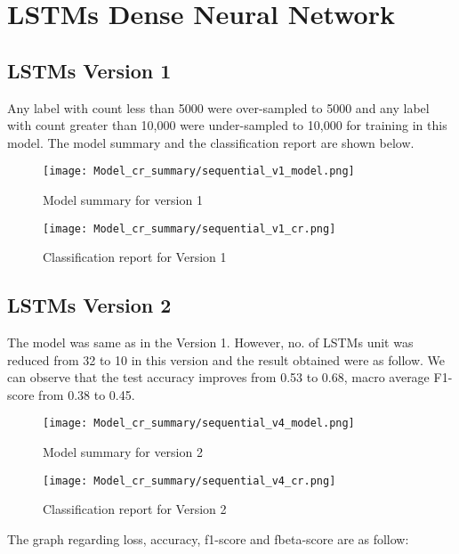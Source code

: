\section{LSTMs Dense Neural Network}

\subsection{LSTMs Version 1}
Any label with count less than 5000 were over-sampled to 5000 and any label with count greater than 10,000 were under-sampled to 10,000 for training in this model. The model summary and the classification report are shown below.

\begin{figure}[H]
    \centering
    \texttt{[image: Model\_cr\_summary/sequential\_v1\_model.png]}
    \caption{Model summary for version 1}
    \label{fig:Model summary for version 1}
\end{figure}

\begin{figure}[H]
    \centering
    \texttt{[image: Model\_cr\_summary/sequential\_v1\_cr.png]}
    \caption{Classification report for Version 1}
    \label{fig: Classification report for Version 1}
\end{figure}

\subsection{LSTMs Version 2}
The model was same as in the Version 1. However, no. of LSTMs unit was reduced from 32 to 10 in this version and the result obtained were as follow. We can observe that the test accuracy improves from 0.53 to 0.68, macro average F1-score from 0.38 to 0.45.

\begin{figure}[H]
    \centering
    \texttt{[image: Model\_cr\_summary/sequential\_v4\_model.png]}
    \caption{Model summary for version 2}
    \label{fig:Model summary for version 2}
\end{figure}

\begin{figure}[H]
    \centering
    \texttt{[image: Model\_cr\_summary/sequential\_v4\_cr.png]}
    \caption{Classification report for Version 2}
    \label{fig: Classification report for Version 2}
\end{figure}

The graph regarding loss, accuracy, f1-score and fbeta-score are as follow:

